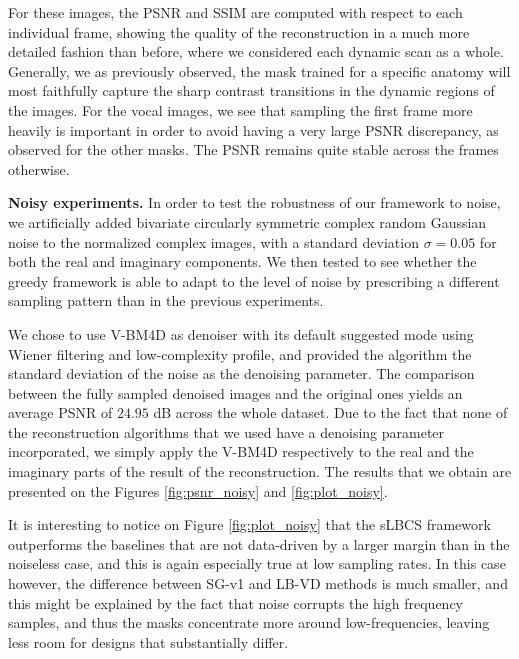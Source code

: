 For these images, the PSNR and SSIM are computed with respect to each individual frame, showing the quality of the reconstruction in a much more detailed fashion than before, where we considered each dynamic scan as a whole. Generally, we as previously observed, the mask trained for a specific anatomy will most faithfully capture the sharp contrast transitions in the dynamic regions of the images. For the vocal images, we see that sampling the first frame more heavily is important in order to avoid having a very large PSNR discrepancy, as observed for the other masks.  The PSNR remains quite stable across the frames otherwise. 


\newpage
\textbf{Noisy experiments.}
In order to test the robustness of our framework to noise, we artificially added bivariate circularly symmetric complex random Gaussian noise to the normalized complex images, with a standard deviation $\sigma = 0.05$ for both the real and imaginary components. We then tested to see whether the greedy framework is able to adapt to the level of noise by prescribing a different sampling pattern than in the previous experiments.

We chose to use V-BM4D \citep{maggioni2012video} as denoiser with its default suggested mode using Wiener filtering and low-complexity profile, and provided the algorithm the standard deviation of the noise as the denoising parameter. The comparison between the fully sampled denoised images and the original ones yields an average PSNR of $24.95$ dB across the whole dataset. Due to the fact that none of the reconstruction algorithms that we used have a denoising parameter incorporated, we simply apply the V-BM4D respectively to the real and the imaginary parts of the result of the reconstruction. The results that we obtain are presented on the Figures \ref{fig:psnr_noisy} and \ref{fig:plot_noisy}. 

It is interesting to notice on Figure \ref{fig:plot_noisy} that the sLBCS framework outperforms the baselines that are not data-driven by a larger margin than in the noiseless case, and this is again especially true at low sampling rates. In this case however, the difference between SG-v1 and LB-VD methods is much smaller, and this might be explained by the fact that noise corrupts the high frequency samples, and thus the masks concentrate more around low-frequencies, leaving less room for designs that substantially differ.%

